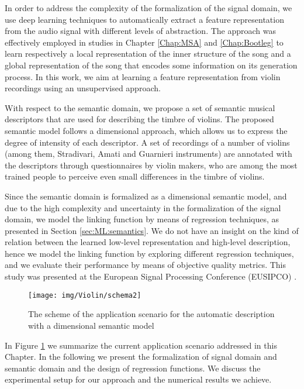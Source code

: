 In order to address the complexity of the formalization of the signal domain, we use deep learning techniques to automatically extract a feature representation from the audio signal with different levels of abstraction. The approach was effectively employed in studies in Chapter \ref{Chap:MSA} and \ref{Chap:Bootleg} to learn respectively a local representation of the inner structure of the song and a global representation of the song that encodes some information on its generation process. In this work, we aim at learning a feature representation from violin recordings using an unsupervised approach.

With respect to the semantic domain, we propose a set of semantic musical descriptors that are used for describing the timbre of violins. The proposed semantic model follows a dimensional approach, which allows us to express the degree of intensity of each descriptor. A set of recordings of a number of violins (among them, Stradivari, Amati and Guarnieri instruments) are annotated with the descriptors through questionnaires by violin makers, who are among the most trained people to perceive even small differences in the timbre of violins.

Since the semantic domain is formalized as a dimensional semantic model, and due to the high complexity and uncertainty in the formalization of the signal domain, we model the linking function by means of regression techniques, as presented in Section \ref{sec:ML:semantics}. We do not have an insight on the kind of relation between the learned low-level representation and high-level description, hence we model the linking function by exploring different regression techniques, and we evaluate their performance by means of  objective quality metrics. This study was presented at the European Signal Processing Conference (EUSIPCO) \cite{Buccoli2015violin}. 


 \begin{figure}[tbp]
    \begin{center}
      \texttt{[image: img/Violin/schema2]}
    \end{center}
  \caption{The scheme of the application scenario for the automatic description with a dimensional semantic model}
  \label{fig:Violin:scheme}
  \end{figure}

In Figure \ref{fig:Violin:scheme} we summarize the current application scenario addressed in this Chapter. In the following we present the formalization of signal domain and semantic domain and the design of regression functions. We discuss the experimental setup for our approach and the numerical results we achieve.


